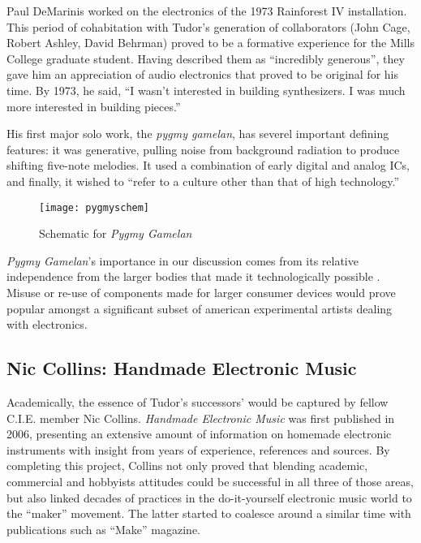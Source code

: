 \begin{itemize}
Paul DeMarinis worked on the electronics of the 1973 Rainforest IV installation. This period of cohabitation with Tudor's generation of collaborators (John Cage, Robert Ashley, David Behrman) proved to be a formative experience for the Mills College graduate student. Having described them as ``incredibly generous'', they gave him an appreciation of audio electronics that proved to be original for his time. By 1973, he said, ``I wasn't interested in building synthesizers. I was much more interested in building pieces.'' \cite{ouzounian2010}
	
	His first major solo work, the \emph{pygmy gamelan}, has severel important defining features: it was generative, pulling noise from background radiation to produce shifting five-note melodies. It used a combination of early digital and analog ICs, and finally, it wished to ``refer to a culture other than that of high technology.''
	
	 \begin{figure}[h!]
	   \caption{Schematic for \emph{Pygmy Gamelan} \cite[p.107]{beirer2011}}
	   \centering
	     \texttt{[image: pygmyschem]}
	 \end{figure}
	 
	 \emph{Pygmy Gamelan}'s importance in our discussion comes from its relative independence from the larger bodies that made it technologically possible \cite[p.27]{beirer2011}. Misuse or re-use of components made for larger consumer devices would prove popular amongst a significant subset of american experimental artists dealing with electronics. 

\subsection{Nic Collins: Handmade Electronic Music} 

Academically, the essence of Tudor’s successors’ would be captured by fellow C.I.E. member Nic Collins. \emph{Handmade Electronic Music} was first published in 2006, presenting an extensive amount of information on homemade electronic instruments with insight from years of experience, references and sources. By completing this project, Collins not only proved that blending academic, commercial and hobbyists attitudes could be successful in all three of those areas, but also linked decades of practices in the do-it-yourself electronic music world to the “maker” movement. The latter started to coalesce around a similar time with publications such as “Make” magazine.


\end{itemize}
